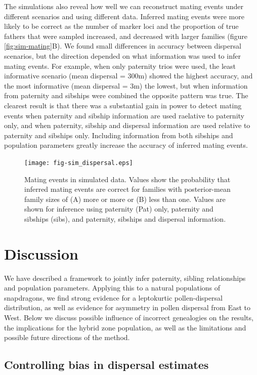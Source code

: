 \documentclass[10pt, a4paper, twocolumn]{article} %
\begin{document}
The simulations also reveal how well we can reconstruct mating events under different scenarios and using different data.
Inferred mating events were more likely to be correct as the number of marker loci and the proportion of true fathers that were sampled increased, and decreased with larger families (figure \ref{fig:sim-mating}B).
We found small differences in accuracy between dispersal scenarios, but the direction depended on what information was used to infer mating events.
For example, when only paternity trios were used, the least informative scenario (mean dispersal = 300m) showed the highest accuracy, and the most informative (mean dispersal = 3m) the lowest, but when information from paternity and sibships were combined the opposite pattern was true.
The clearest result is that there was a substantial gain in power to detect mating events when paternity and sibship information are used raelative to paternity only, and when paternity, sibship and dispersal information are used relative to paternity and sibships only.
Including information from both sibships and population parameters greatly increase the accuracy of inferred mating events.

\begin{figure}
    \centering
    \texttt{[image: fig-sim\_dispersal.eps]}
    \caption{
        Mating events in simulated data.
        Values show the probability that inferred mating events are correct for families with posterior-mean family sizes of (A) more or more or (B) less than one.
        Values are shown for inference using paternity (Pat) only, paternity and sibships (sibs), and paternity, sibships and dispersal information.
    }
    \label{fig:sim-paternity}
\end{figure}


\section{Discussion}

We have described a framework to jointly infer paternity, sibling relationships and population parameters. 
Applying this to a natural populations of snapdragons, we find strong evidence for a leptokurtic pollen-dispersal distribution, as well as evidence for asymmetry in pollen dispersal from East to West.
Below we discuss possible influence of incorrect genealogies on the results, the implications for the hybrid zone population, as well as the limitations and possible future directions of the method.

\subsection{Controlling bias in dispersal estimates}
\end{document}
